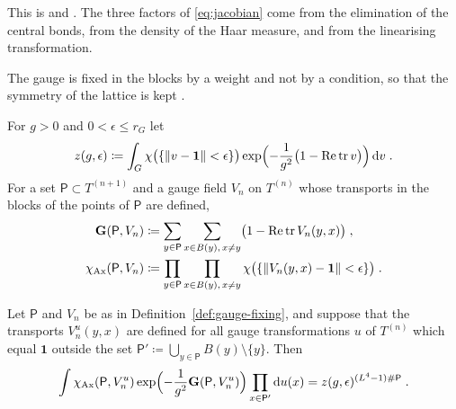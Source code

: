 \documentclass[11pt]{preprint}
\newcommand{\dd}{\mathrm{d}}
\newcommand{\id}{\mathbf 1}
\newcommand{\re}{\operatorname{Re}}
\DeclarePairedDelimiter{\norm}{\lVert}{\rVert}
\numberwithin{equation}{section}
\begin{document}
This is \cite[(2.10)--(2.12), pp.~267--268]{BalabanRG1} and \cite[(1.14), (1.15), p.~249]{BalabanCRE}. The three factors of \eqref{eq:jacobian} come from the elimination of the central bonds, from the density of the Haar measure, and from the linearising transformation.

The gauge is fixed in the blocks by a weight and not by a condition, so that the symmetry of the lattice is kept \cite[(1.5)--(1.7), p.~247]{BalabanCRE}.

\begin{definition}\label{def:gauge-fixing}
For $g > 0$ and $0 < \epsilon \leqslant r_G$ let
\begin{equation}\label{eq:gauge-normalisation}
    z(g, \epsilon) \coloneqq \int_G\chi\bigl(\{ \norm{v - \id} < \epsilon \}\bigr)\exp\Bigl(-\frac{1}{g^2}\bigl(1 - \re\tr v\bigr)\Bigr)\,\dd v\;.
\end{equation}
For a set $\mathsf P \subset T^{(n+1)}$ and a gauge field $V_n$ on $T^{(n)}$ whose transports in the blocks of the points of $\mathsf P$ are defined,
\begin{equation}\label{eq:gauge-fixing-function}
\begin{aligned}
    \mathbf G(\mathsf P, V_n) &\coloneqq \sum_{y \in \mathsf P}\sum_{x \in B(y),\, x \neq y}\bigl(1 - \re\tr V_n(y, x)\bigr)\;,\\
    \chi_{\mathrm{Ax}}(\mathsf P, V_n) &\coloneqq \prod_{y \in \mathsf P}\prod_{x \in B(y),\, x \neq y}\chi\bigl(\{ \norm{V_n(y, x) - \id} < \epsilon \}\bigr)\;.
\end{aligned}
\end{equation}
\end{definition}

\begin{lemma}\label{lem:gauge-fixing}
Let $\mathsf P$ and $V_n$ be as in Definition~\ref{def:gauge-fixing}, and suppose that the transports $V^u_n(y, x)$ are defined for all gauge transformations $u$ of $T^{(n)}$ which equal $\id$ outside the set $\mathsf P' \coloneqq \bigcup_{y \in \mathsf P}B(y) \setminus \{ y \}$. Then
\begin{equation}\label{eq:gauge-fixing-identity}
    \int\chi_{\mathrm{Ax}}(\mathsf P, V^u_n)\exp\Bigl(-\frac{1}{g^2}\mathbf G(\mathsf P, V^u_n)\Bigr)\prod_{x \in \mathsf P'}\dd u(x) = z(g, \epsilon)^{(L^4-1)\#\mathsf P}\;.
\end{equation}
\end{lemma}
\end{document}

